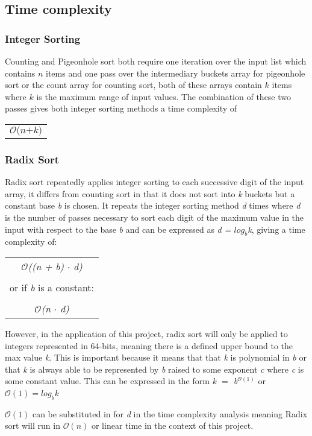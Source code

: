 \documentclass[12pt]{article}
\begin{document}
	\subsection{Time complexity}
	\subsubsection{Integer Sorting}
	Counting and Pigeonhole sort both require one iteration over the input list which contains $n$ items and one pass over the intermediary buckets array for pigeonhole sort or the count array for counting sort, both of these arrays contain $k$ items where $k$ is the maximum range of input values. The combination of these two passes gives both integer sorting methods a time complexity of 
	\begin{table}[!h]
		\begin{center}
			\begin{tabular}{c}
				$\mathcal{O}\textit{(n+k)}$ 
			\end{tabular}				
			\end{center}
		\end{table}
	\subsubsection{Radix Sort}
	Radix sort repeatedly applies integer sorting to each successive digit of the input array, it differs from counting sort in that it does not sort into \textit{k} buckets but a constant base \textit{b} is chosen. It repeats the integer sorting method \textit{d} times where \textit{d} is the number of passes necessary to sort each digit of the maximum value in the input with respect to the base \textit{b} and can be expressed as \textit{d = $log_b$k}, giving a time complexity of:
	\begin{table}[!h]
		\begin{center}
			\begin{tabular}{c}

	 $\mathcal{O}$\textit{((n + b) $\cdot$ d)}
 \\ \\
	or if \textit{b} is a constant:
\\	\\
	$\mathcal{O}$\textit{(n $\cdot$ d)} 
			\end{tabular}
				
			\end{center}
		\end{table}
			
	However, in the application of this project, radix sort will only be applied to integers represented in 64-bits, meaning there is a defined upper bound to the max value \textit{k}. This is important because it means that that \textit{k} is polynomial in \textit{b} or that \textit{k} is always able to be represented by \textit{b} raised to some exponent \textit{c} where \textit{c} is some constant value. This can be expressed in the form \textit{k $=$ b$^{\mathcal{O}(1)}$} or \textit{$\mathcal{O}(1) = log_b$k}
	\par
	$\mathcal{O}(1)$ can be substituted in for \textit{d} in the time complexity analysis meaning Radix sort will run in $\mathcal{O}(n)$ or linear time in the context of this project.
	\pagebreak
\end{document}
